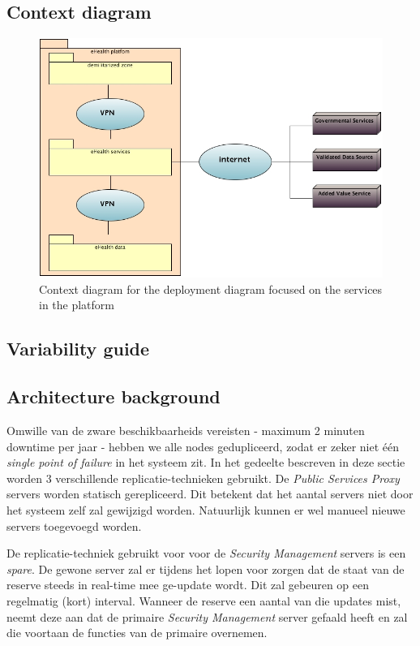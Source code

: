 \documentclass[a4paper,10pt]{article}
\begin{document}
\subsection{Context diagram}

\begin{figure}[!h]
  \includegraphics[width=\textwidth]{../images/deployment_services_context.jpg}
    \caption{Context diagram for the deployment diagram focused on the services in the platform}
\end{figure}

\subsection{Variability guide}

\subsection{Architecture background}
\label{subsec:arch_back_dep_serv}
Omwille van de zware beschikbaarheids vereisten - maximum 2 minuten downtime per jaar - hebben we alle nodes gedupliceerd, zodat er zeker niet één \textit{single point of failure} in het systeem zit. In het gedeelte bescreven in deze sectie worden 3 verschillende replicatie-technieken gebruikt. De \textit{Public Services Proxy} servers worden statisch gerepliceerd. Dit betekent dat het aantal servers niet door het systeem zelf zal gewijzigd worden. Natuurlijk kunnen er wel manueel nieuwe servers toegevoegd worden.

De replicatie-techniek gebruikt voor voor de \textit{Security Management} servers is een \textit{spare}. De gewone server zal er tijdens het lopen voor zorgen dat de staat van de reserve steeds in real-time mee ge-update wordt. Dit zal gebeuren op een regelmatig (kort) interval. Wanneer de reserve een aantal van die updates mist, neemt deze aan dat de primaire \textit{Security Management} server gefaald heeft en zal die voortaan de functies van de primaire overnemen.
	
\end{document}
